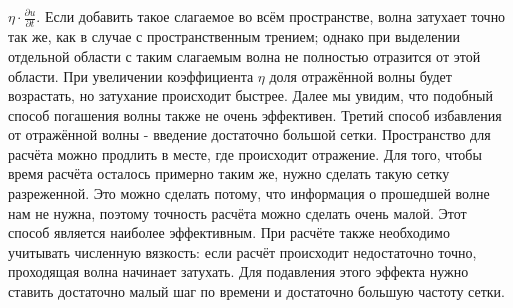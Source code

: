 \documentclass[
11pt,%
tightenlines,%
twoside,%
onecolumn,%
nofloats,%
nobibnotes,%
nofootinbib,%
superscriptaddress,%
noshowpacs,%
centertags]%
{revtex4}
\begin{document}
$\eta \cdot \frac{\partial u}{\partial t}$. Если добавить такое слагаемое во всём пространстве, волна
затухает точно так же, как в случае с пространственным трением; однако при выделении отдельной области
с таким слагаемым волна не полностью отразится от этой области. При увеличении коэффициента $\eta$ 
доля отражённой волны будет возрастать, но затухание происходит быстрее. Далее мы увидим, что 
подобный способ погашения волны также не очень эффективен. \newline
Третий способ избавления от отражённой волны - введение достаточно большой сетки. Пространство для 
расчёта можно продлить в месте, где происходит отражение. Для того, чтобы время 
расчёта осталось примерно таким же, нужно сделать такую сетку разреженной. Это можно сделать потому, 
что информация о прошедшей волне нам не нужна, поэтому точность расчёта можно сделать очень малой. 
Этот способ является наиболее эффективным. \newline
При расчёте также необходимо учитывать численную вязкость: если расчёт происходит недостаточно точно,
проходящая волна начинает затухать. Для подавления этого эффекта нужно ставить достаточно малый шаг
по времени и достаточно большую частоту сетки.
\end{document}

